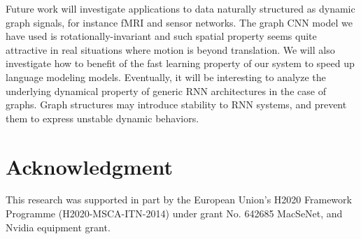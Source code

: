 \documentclass{article} %
\newcommand{\todo}[1]{{\color{red} #1 }}
\begin{document}
Future work will investigate applications to data naturally structured as
dynamic graph signals, for instance fMRI and sensor networks. The graph CNN
model we have used is rotationally-invariant and such spatial property seems
quite attractive in real situations where motion is beyond translation. We will
also investigate how to benefit of the fast learning property of our system to
speed up language modeling models. Eventually, it will be interesting to
analyze the underlying dynamical property of generic RNN architectures in the
case of graphs. Graph structures may introduce stability to RNN systems, and
prevent them to express unstable dynamic behaviors.


\section*{Acknowledgment}

This research was supported in part by the European Union's H2020 Framework
Programme (H2020-MSCA-ITN-2014) under grant No. 642685 MacSeNet, and Nvidia
equipment grant.


{
	\small
	
	
}
\end{document}
